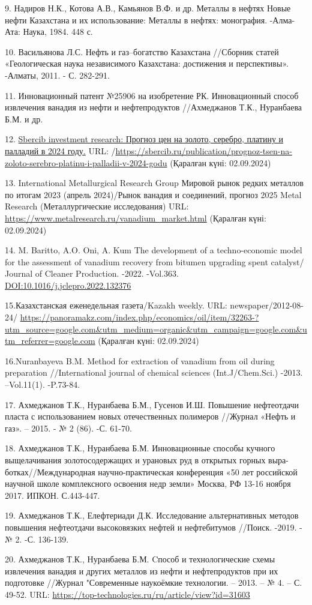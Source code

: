 \begin{references}
9. Надиров Н.К., Котова А.В., Камьянов В.Ф. и др. Металлы в нефтях Новые
нефти Казахстана и их использование: Металлы в нефтях: монография.
-Алма-Ата: Наука, 1984. 448 с.

10. Васильянова Л.С. Нефть и газ--богатство Казахстана //Сборник статей
«Геологическая наука независимого Казахстана: достижения и перспективы».
-Алматы, 2011. - С. 282-291.

11. Инновационный патент №25906 на изобретение РК. Инновационный способ
извлечения ванадия из нефти и нефтепродуктов //Ахмеджанов Т.К.,
Нуранбаева Б.М. и др.

12.
\href{https://sbercib.ru/publications/sbercib-investment-research}{Sbercib
investment research: Прогноз цен на золото, серебро, платину и палладий
в 2024 году.} URL:
/\url{https://sbercib.ru/publication/prognoz-tsen-na-zoloto-serebro-platinu-i-palladii-v-2024-godu}
(Қаралған күні: 02.09.2024)

13. International Metallurgical Research Group Мировой рынок редких
металлов по итогам 2023 (апрель 2024)/Рынок ванадия и соединений,
прогноз 2025 Metal Research (Металлургические исследования) URL:
\url{https://www.metalresearch.ru/vanadium_market.html} (Қаралған күні:
02.09.2024)

14. M. Baritto, A.O. Oni, A. Kum The development of a techno-economic
model for the assessment of vanadium recovery from bitumen upgrading
spent catalyst/ Journal of Cleaner Production. -2022. -Vol.363.
\href{https://doi.org/10.1016/j.jclepro.2022.132376}{DOI:10.1016/j.jclepro.2022.132376}

15.Казахстанская еженедельная газета/Kazakh weekly. URL:
newspaper/2012-08-24/
\url{https://panoramakz.com/index.php/economics/oil/item/32263-?utm_source=google.com&utm_medium=organic&utm_campaign=google.com&utm_referrer=google.com}
(Қаралған күні: 02.09.2024)

16.Nuranbayeva B.M. Method for extraction of vanadium from oil during
preparation //International journal of chemical sciences
(Int.J/Chem.Sci.) -2013. --Vol.11(1). -P.73-84.

17. Ахмеджанов Т.К., Нуранбаева Б.М., Гусенов И.Ш. Повышение нефтеотдачи
пласта с использованием новых отечественных полимеров //Журнал «Нефть и
газ». -- 2015. - № 2 (86). -С. 61-70.

18. Ахмеджанов Т.К., Нуранбаева Б.М. Инновационные способы кучного
выщелачивания золотосодержащих и урановых руд в открытых горных
выра-ботках//Международная научно-практическая конференция «50 лет
российской научной школе комплексного освоения недр земли» Москва, РФ
13-16 ноября 2017. ИПКОН. С.443-447.

19. Ахмеджанов Т.К., Елефтериади Д.К. Исследование альтернативных
методов повышения нефтеотдачи высоковязких нефтей и нефтебитумов
//Поиск. -2019. -№ 2. -С. 136-139.

20. Ахмеджанов Т.К., Нуранбаева Б.М. Cпособ и технологические схемы
извлечения ванадия и других металлов из нефти и нефтепродуктов при их
подготовке //Журнал "Современные наукоёмкие технологии. -- 2013. -- № 4.
-- С. 49-52. URL:
\url{https://top-technologies.ru/ru/article/view?id=31603}
\end{references}

